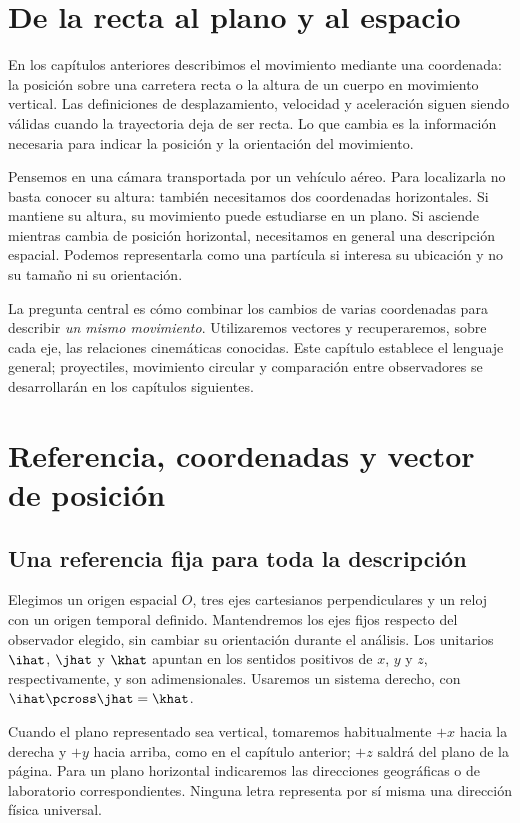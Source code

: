 \section{De la recta al plano y al espacio}

En los capítulos anteriores describimos el movimiento mediante una coordenada:
la posición sobre una carretera recta o la altura de un cuerpo en movimiento
vertical. Las definiciones de desplazamiento, velocidad y aceleración siguen
siendo válidas cuando la trayectoria deja de ser recta. Lo que cambia es la
información necesaria para indicar la posición y la orientación del movimiento.

Pensemos en una cámara transportada por un vehículo aéreo. Para localizarla
no basta conocer su altura: también necesitamos dos coordenadas horizontales.
Si mantiene su altura, su movimiento puede estudiarse en un plano. Si asciende
mientras cambia de posición horizontal, necesitamos en general una descripción
espacial. Podemos representarla como una partícula si interesa su ubicación
y no su tamaño ni su orientación.

La pregunta central es cómo combinar los cambios de varias coordenadas para
describir \emph{un mismo movimiento}. Utilizaremos vectores y recuperaremos,
sobre cada eje, las relaciones cinemáticas conocidas. Este capítulo establece
el lenguaje general; proyectiles, movimiento circular y comparación entre
observadores se desarrollarán en los capítulos siguientes.

\section{Referencia, coordenadas y vector de posición}

\subsection{Una referencia fija para toda la descripción}

Elegimos un origen espacial \(O\), tres ejes cartesianos perpendiculares y un
reloj con un origen temporal definido. Mantendremos los ejes fijos respecto
del observador elegido, sin cambiar su orientación durante el análisis.
Los unitarios \(\ihat\), \(\jhat\) y \(\khat\) apuntan en los sentidos
positivos de \(x\), \(y\) y \(z\), respectivamente, y son adimensionales.
Usaremos un sistema derecho, con \(\ihat\pcross\jhat=\khat\).

Cuando el plano representado sea vertical, tomaremos habitualmente \(+x\)
hacia la derecha y \(+y\) hacia arriba, como en el capítulo anterior;
\(+z\) saldrá del plano de la página. Para un plano horizontal indicaremos
las direcciones geográficas o de laboratorio correspondientes. Ninguna letra
representa por sí misma una dirección física universal.

